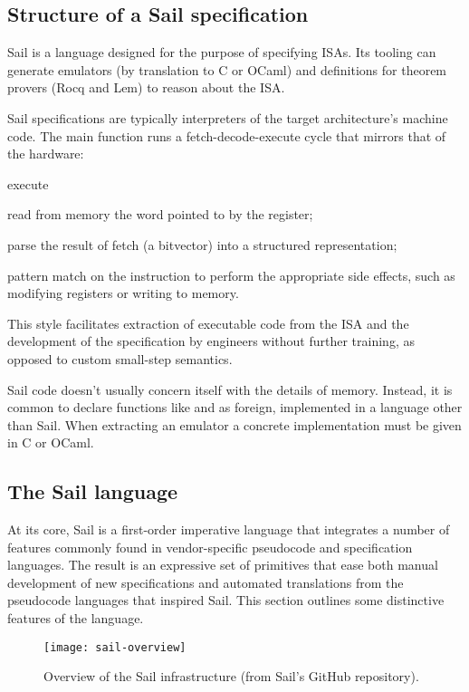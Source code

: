 \subsection{Structure of a Sail specification}
\label{sec:sail-structure}

Sail \cite{Armstrong} is a language designed for the purpose of specifying ISAs. Its tooling can generate emulators (by translation to C or OCaml) and definitions for theorem provers (\eg Rocq and Lem) to reason about the ISA.

Sail specifications are typically interpreters of the target architecture's machine code. The main function runs a fetch-decode-execute cycle that mirrors that of the hardware:
\begin{labeling}[~--]{execute}
\item[fetch] read from memory the word pointed to by the  register;
\item[decode] parse the result of fetch (a bitvector) into a structured representation;
\item[execute] pattern match on the instruction to perform the appropriate side effects, such as modifying registers or writing to memory.
\end{labeling}

This style facilitates extraction of executable code from the ISA and the development of the specification by engineers without further training, as opposed to \eg custom small-step semantics.

Sail code doesn't usually concern itself with the details of memory. Instead, it is common to declare functions like  and  as foreign, \ie implemented in a language other than Sail. When extracting an emulator a concrete implementation must be given in C or OCaml.

\subsection{The Sail language}

At its core, Sail is a first-order imperative language that integrates a number of features commonly found in vendor-specific pseudocode and specification languages. The result is an expressive set of primitives that ease both manual development of new specifications and automated translations from the pseudocode languages that inspired Sail. This section outlines some distinctive features of the language.

\begin{figure}
  \centering
  \texttt{[image: sail-overview]}
  \caption{Overview of the Sail infrastructure (from Sail's GitHub repository).}
  \label{fig:sail-overview}
\end{figure}

